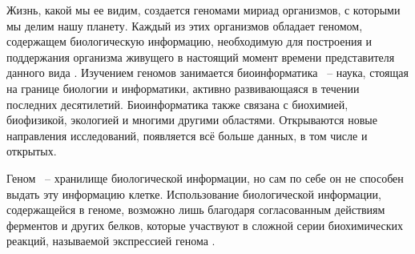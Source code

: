 \documentclass[times,specification,annotation]{itmo-student-thesis}
\begin{document}





\tableofcontents

\startprefacepage

Жизнь, какой мы ее видим, создается геномами мириад организмов, с которыми мы делим нашу планету. Каждый из этих организмов обладает геномом, содержащем биологическую информацию, необходимую для построения и поддержания организма живущего в настоящий момент времени представителя данного вида \cite{Introduction}. Изучением геномов занимается биоинформатика ~-- наука, стоящая на границе биологии и информатики, активно развивающаяся в течении последних десятилетий. Биоинформатика также связана с биохимией, биофизикой, экологией и многими другими областями. Открываются новые направления исследований, появляется всё больше данных, в том числе и открытых.

Геном ~-- хранилище биологической информации, но сам по себе он не способен выдать эту информацию клетке. Использование биологической информации, содержащейся в геноме, возможно лишь благодаря согласованным действиям ферментов и других белков, которые участвуют в сложной серии биохимических реакций, называемой экспрессией генома \cite{Introduction}.
\end{document}
